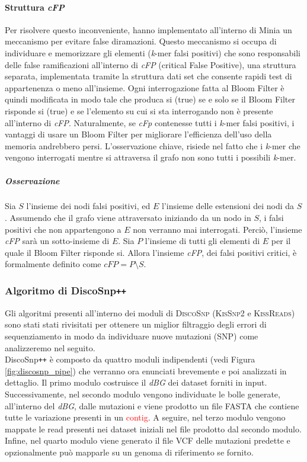 \documentclass[../main.tex]{subfiles}
\begin{document}
\paragraph{Struttura \textit{cFP}} Per risolvere questo inconveniente,\cite{chikhi2013space} hanno implementato all'interno di Minia un meccanismo per evitare false diramazioni. Questo meccanismo si occupa di individuare e memorizzare gli elementi (\textit{k}-mer falsi positivi) che sono responsabili delle false ramificazioni all'interno di \textit{cFP} (critical False Positive), una struttura separata, implementata tramite la struttura dati set che consente rapidi test di appartenenza o meno all'insieme. Ogni interrogazione fatta al Bloom Filter è quindi modificata in modo tale che produca si (true) se e solo se il Bloom Filter risponde si (true) e se l'elemento su cui si sta interrogando non è presente all'interno di \textit{cFP}. Naturalmente, se \textit{cFp} contenesse tutti i \textit{k}-mer falsi positivi, i vantaggi di usare un Bloom Filter per migliorare l'efficienza dell'uso della memoria andrebbero persi. L'osservazione chiave, risiede nel fatto che i \textit{k}-mer che vengono interrogati mentre si attraversa il grafo non sono tutti i possibili \textit{k}-mer. 

\subparagraph{Osservazione} Sia $S$ l'insieme dei nodi falsi positivi, ed $E$ l'insieme delle estensioni dei nodi da $S$. Assumendo che il grafo viene attraversato iniziando da un nodo in $S$, i falsi positivi che non appartengono a $E$ non verranno mai interrogati. Perciò, l'insieme \textit{cFP} sarà un sotto-insieme di $E$. Sia $P$ l'insieme di tutti gli elementi di $E$ per il quale il Bloom Filter risponde si. Allora l'insieme \textit{cFP}, dei falsi positivi critici, è formalmente definito come $cFP = P \setminus S$.

\subsubsection{Algoritmo di DiscoSnp\texttt{++}}
Gli algoritmi presenti all'interno dei moduli di \textsc{DiscoSnp} (\textsc{KisSnp2} e \textsc{KissReads}) sono stati stati rivisitati per ottenere un miglior filtraggio degli errori di sequenziamento in modo da individuare nuove mutazioni (SNP) come analizzeremo nel seguito.\\

\noindent
DiscoSnp\texttt{++} è composto da quattro moduli indipendenti (vedi Figura \ref{fig:discosnp_pipe}) che verranno ora enunciati brevemente e poi analizzati in dettaglio. Il primo modulo costruisce il \textit{dBG} dei dataset forniti in input. Successivamente, nel secondo modulo vengono individuate le bolle generate, all'interno del \textit{dBG}, dalle mutazioni e viene prodotto un file FASTA che contiene tutte le variazione presenti in un \textcolor{red}{contig}. A seguire, nel terzo modulo vengono mappate le read presenti nei dataset iniziali nel file prodotto dal secondo modulo. Infine, nel quarto modulo viene generato il file VCF delle mutazioni predette e opzionalmente può mapparle su un genoma di riferimento se fornito.
\end{document}
